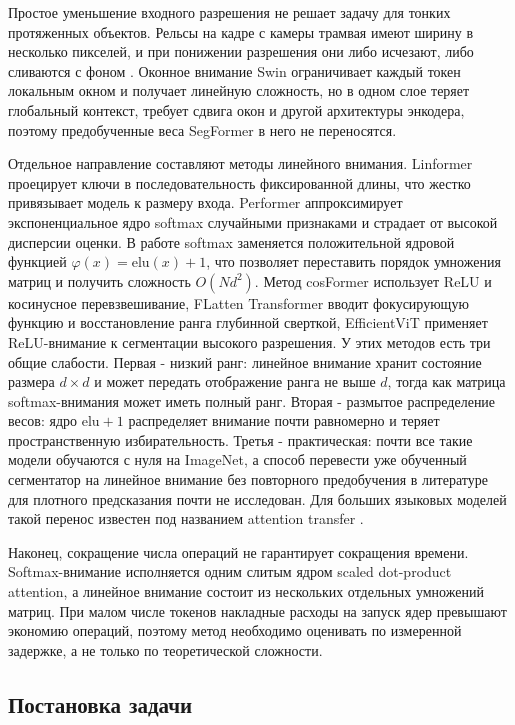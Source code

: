 \documentclass[a4paper,14pt]{article}
\numberwithin{figure}{section}
\numberwithin{table}{section}
\begin{document}
	Простое уменьшение входного разрешения не решает задачу для тонких протяженных объектов. Рельсы на кадре с камеры трамвая имеют ширину в
	несколько пикселей, и при понижении разрешения они либо исчезают, либо сливаются с фоном \cite{myarticle}. Оконное внимание Swin \cite{swin}
	ограничивает каждый токен локальным окном и получает линейную сложность, но в одном слое теряет глобальный контекст, требует сдвига окон и
	другой архитектуры энкодера, поэтому предобученные веса SegFormer в него не переносятся.

	Отдельное направление составляют методы линейного внимания. Linformer \cite{linformer} проецирует ключи в последовательность фиксированной длины,
	что жестко привязывает модель к размеру входа. Performer \cite{performer} аппроксимирует экспоненциальное ядро softmax случайными признаками и страдает
	от высокой дисперсии оценки. В работе \cite{katharopoulos} softmax заменяется положительной ядровой функцией $\varphi(x) = \mathrm{elu}(x) + 1$,
	что позволяет переставить порядок умножения матриц и получить сложность $O(N d^2)$. Метод cosFormer \cite{cosformer} использует ReLU и косинусное
	перевзвешивание, FLatten Transformer \cite{flatten} вводит фокусирующую функцию и восстановление ранга глубинной сверткой, EfficientViT \cite{efficientvit}
	применяет ReLU-внимание к сегментации высокого разрешения. У этих методов есть три общие слабости. Первая - низкий ранг: линейное внимание хранит
	состояние размера $d \times d$ и может передать отображение ранга не выше $d$, тогда как матрица softmax-внимания может иметь полный ранг.
	Вторая - размытое распределение весов: ядро $\mathrm{elu} + 1$ распределяет внимание почти равномерно и теряет пространственную избирательность.
	Третья - практическая: почти все такие модели обучаются с нуля на ImageNet, а способ перевести уже обученный сегментатор на линейное внимание без
	повторного предобучения в литературе для плотного предсказания почти не исследован. Для больших языковых моделей такой перенос известен под названием
	attention transfer \cite{lolcats}.

	Наконец, сокращение числа операций не гарантирует сокращения времени. Softmax-внимание исполняется одним слитым ядром scaled dot-product attention,
	а линейное внимание состоит из нескольких отдельных умножений матриц. При малом числе токенов накладные расходы на запуск ядер превышают экономию
	операций, поэтому метод необходимо оценивать по измеренной задержке, а не только по теоретической сложности.

\subsection{Постановка задачи}
\end{document}
